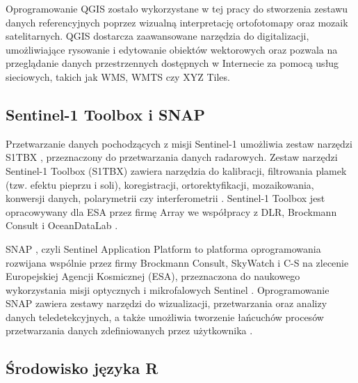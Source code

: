 \documentclass{amuthesis}
\begin{document}
Oprogramowanie QGIS zostało wykorzystane w tej pracy do stworzenia
zestawu danych referencyjnych poprzez wizualną interpretację
ortofotomapy oraz mozaik satelitarnych. QGIS dostarcza zaawansowane
narzędzia do digitalizacji, umożliwiające rysowanie i edytowanie
obiektów wektorowych oraz pozwala na przeglądanie danych przestrzennych
dostępnych w Internecie za pomocą usług sieciowych, takich jak WMS, WMTS
czy XYZ Tiles.

\hypertarget{sentinel-1-toolbox-i-snap}{%
\subsection{Sentinel-1 Toolbox i SNAP}\label{sentinel-1-toolbox-i-snap}}

Przetwarzanie danych pochodzących z misji Sentinel-1 umożliwia zestaw
narzędzi S1TBX \autocite{s1tbx}, przeznaczony do przetwarzania danych
radarowych. Zestaw narzędzi Sentinel-1 Toolbox (S1TBX) zawiera narzędzia
do kalibracji, filtrowania plamek (tzw. efektu pieprzu i soli),
koregistracji, ortorektyfikacji, mozaikowania, konwersji danych,
polarymetrii czy interferometrii \autocite{sentinel-1-toolbox}.
Sentinel-1 Toolbox jest opracowywany dla ESA przez firmę Array we
współpracy z DLR, Brockmann Consult i OceanDataLab
\autocite{sentinel-1-toolbox}.

SNAP \autocite{snap}, czyli Sentinel Application Platform to platforma
oprogramowania rozwijana wspólnie przez firmy Brockmann Consult,
SkyWatch i C-S na zlecenie Europejskiej Agencji Kosmicznej (ESA),
przeznaczona do naukowego wykorzystania misji optycznych i mikrofalowych
Sentinel \autocite{snap-desktop,esa_snap}. Oprogramowanie SNAP zawiera
zestawy narzędzi do wizualizacji, przetwarzania oraz analizy danych
teledetekcyjnych, a także umożliwia tworzenie łańcuchów procesów
przetwarzania danych zdefiniowanych przez użytkownika
\autocite{hejmanowska_2020_dane,moskolai_2022_s1_workflow}.

\hypertarget{ux15brodowisko-jux119zyka-r}{%
\subsection{Środowisko języka R}\label{ux15brodowisko-jux119zyka-r}}
\end{document}

